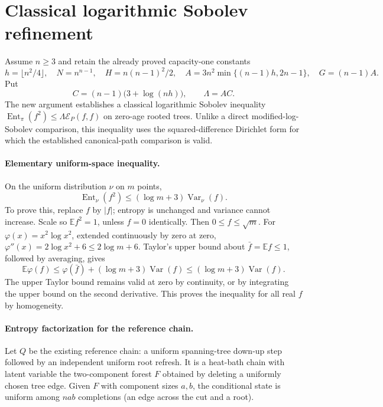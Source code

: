 \documentclass[11pt]{article}
\begin{document}
\section{Classical logarithmic Sobolev refinement}
\label{sec:classical-lsi}
Assume $n\ge3$ and retain the already proved capacity-one constants
\[
 h=\lfloor n^2/4\rfloor,\quad N=n^{n-1},\quad H=n(n-1)^2/2,
 \quad A=3n^2\min\{(n-1)h,2n-1\},\quad G=(n-1)A.
\]
Put
\[
 C=(n-1)\bigl(3+\log(nh)\bigr),\qquad \Lambda=AC.
\]
The new argument establishes a classical logarithmic Sobolev
inequality $\operatorname{Ent}_\pi(f^2)\le\Lambda\mathcal E_P(f,f)$
on zero-age rooted trees. Unlike a direct modified-log-Sobolev
comparison, this inequality uses the squared-difference Dirichlet
form for which the established canonical-path comparison is valid.

\paragraph{Elementary uniform-space inequality.}
On the uniform distribution $\nu$ on $m$ points,
\[
 \operatorname{Ent}_\nu(f^2)\le(\log m+3)\operatorname{Var}_\nu(f).
\]
To prove this, replace $f$ by $|f|$; entropy is unchanged and variance
cannot increase. Scale so $\mathbb E f^2=1$, unless $f=0$ identically.
Then $0\le f\le\sqrt m$. For $\varphi(x)=x^2\log x^2$, extended
continuously by zero at zero, $\varphi''(x)=2\log x^2+6\le2\log m+6$.
Taylor's upper bound about $\bar f=\mathbb E f\le1$, followed by
averaging, gives
\[
 \mathbb E\varphi(f)\le\varphi(\bar f)+(\log m+3)\operatorname{Var}(f)
 \le(\log m+3)\operatorname{Var}(f).
\]
The upper Taylor bound remains valid at zero by continuity, or by
integrating the upper bound on the second derivative. This proves
the inequality for all real $f$ by homogeneity.

\paragraph{Entropy factorization for the reference chain.}
Let $Q$ be the existing reference chain: a uniform spanning-tree
down-up step followed by an independent uniform root refresh. It
is a heat-bath chain with latent variable the two-component forest
$F$ obtained by deleting a uniformly chosen tree edge. Given $F$
with component sizes $a,b$, the conditional state is uniform among
$nab$ completions (an edge across the cut and a root).
\end{document}
